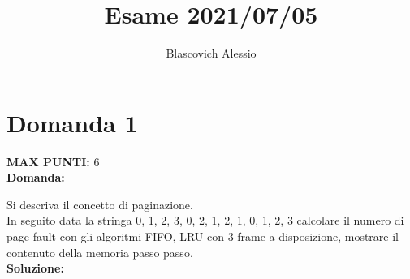 \documentclass{article}
\title{Esame 2021/07/05}
\author{Blascovich Alessio}
\date{}
\begin{document}
    \maketitle
    \section*{Domanda 1}
    \textbf{MAX PUNTI:} 6\\
    \textbf{Domanda:}

    Si descriva il concetto di paginazione.\\
    In seguito data la stringa 0, 1, 2, 3, 0, 2, 1, 2, 1, 0, 1, 2, 3 calcolare il numero di page fault con gli algoritmi FIFO, LRU con 3 frame a disposizione, mostrare il contenuto della memoria passo passo.\\
    \textbf{Soluzione:}
\end{document}
